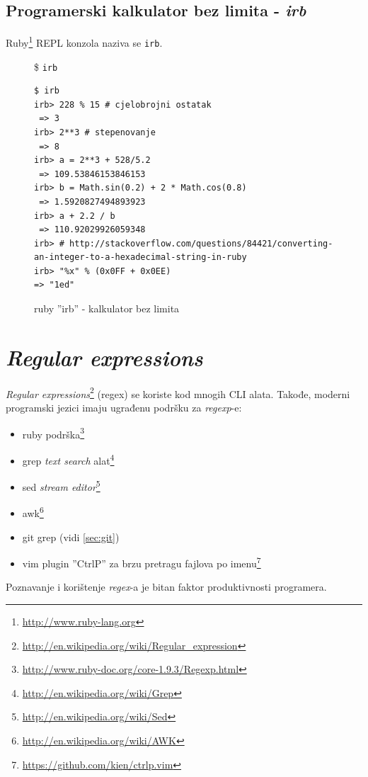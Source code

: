 \documentclass[times, utf8, seminar]{fit}
\begin{document}
\subsection{Programerski kalkulator bez limita - \emph{irb}}

Ruby\footnote{\url{http://www.ruby-lang.org}} REPL konzola naziva se \verb+irb+. 


\begin{figure}[H]
\$ \verb+irb+

\begin{lstlisting}
$ irb
irb> 228 % 15 # cjelobrojni ostatak
 => 3 
irb> 2**3 # stepenovanje
 => 8 
irb> a = 2**3 + 528/5.2
 => 109.53846153846153 
irb> b = Math.sin(0.2) + 2 * Math.cos(0.8)
 => 1.5920827494893923 
irb> a + 2.2 / b
 => 110.92029926059348
irb> # http://stackoverflow.com/questions/84421/converting-an-integer-to-a-hexadecimal-string-in-ruby
irb> "%x" % (0x0FF + 0x0EE) 
=> "1ed" 

\end{lstlisting}

\caption{ruby ''irb'' - kalkulator bez limita}
\end{figure}

\section{\emph{Regular expressions}}

\emph{Regular expressions}\footnote{\url{http://en.wikipedia.org/wiki/Regular_expression}} (regex) se koriste kod mnogih CLI alata. Takođe, moderni programski jezici imaju ugrađenu podršku za \emph{regexp}-e:
\begin{itemize}
   \item ruby podrška\footnote{\url{http://www.ruby-doc.org/core-1.9.3/Regexp.html}}
   \item grep \emph{text search} alat\footnote{\url{http://en.wikipedia.org/wiki/Grep}}
   \item sed \emph{stream editor}\footnote{\url{http://en.wikipedia.org/wiki/Sed}}
   \item awk\footnote{\url{http://en.wikipedia.org/wiki/AWK}}
   \item git grep (vidi \ref{sec:git})
   \item vim plugin ''CtrlP'' za brzu pretragu fajlova po imenu\footnote{\url{https://github.com/kien/ctrlp.vim}}
\end{itemize}

Poznavanje i korištenje \emph{regex}-a je bitan faktor produktivnosti programera.
 
\end{document}
